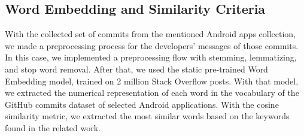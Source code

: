 \subsection{Word Embedding and Similarity Criteria}
With the collected set of commits from the mentioned Android apps collection, we made a preprocessing process for the developers' messages of those commits. In this case, we implemented a preprocessing flow with stemming, lemmatizing, and stop word removal. After that, we used the static pre-trained Word Embedding model, trained on 2 million Stack Overflow posts. With that model, we extracted the numerical representation of each word in the vocabulary of the GitHub commits dataset of selected Android applications. With the cosine similarity metric, we extracted the most similar words based on the keywords found in the related work.


